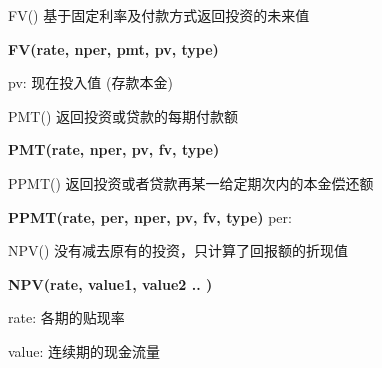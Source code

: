 \documentclass[10pt, a4paper]{article}
\begin{document}
FV() 基于固定利率及付款方式返回投资的未来值
\begin{center}
    \textbf{FV(rate, nper, pmt, pv, type)}

    pv: 现在投入值 (存款本金)
\end{center}

PMT() 返回投资或贷款的每期付款额
\begin{center}
    \textbf{PMT(rate, nper, pv, fv, type)}
\end{center}

PPMT() 返回投资或者贷款再某一给定期次内的本金偿还额

\begin{center}
    \textbf{PPMT(rate, per, nper, pv, fv, type)}
    per: 
\end{center}

NPV() 没有减去原有的投资，只计算了回报额的折现值  
\begin{center}
    \textbf{NPV(rate, value1, value2 .. )}

    rate: 各期的贴现率
    
    value: 连续期的现金流量
\end{center}

 
\end{document}
